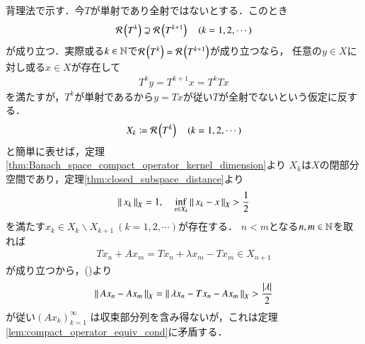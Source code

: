 	\begin{prf}
		背理法で示す．今$T$が単射であり全射ではないとする．このとき
		\begin{align}
			\mathcal{R}\left( T^k \right) \supsetneq \mathcal{R}\left( T^{k+1} \right) \quad (k = 1,2,\cdots)
		\end{align}
		が成り立つ．実際或る$k \in \mathbb{N}$で$\mathcal{R}\left( T^k \right) = \mathcal{R}\left( T^{k+1} \right)$が成り立つなら，
		任意の$y \in X$に対し或る$x \in X$が存在して
		\begin{align}
			T^{k} y = T^{k+1} x = T^k T x
		\end{align}
		を満たすが，$T^k$が単射であるから$y = T x$が従い$T$が全射でないという仮定に反する．
		\begin{align}
			X_k \coloneqq \mathcal{R}\left( T^k \right) \quad (k = 1,2,\cdots)
		\end{align}
		と簡単に表せば，定理\ref{thm:Banach_space_compact_operator_kernel_dimension}より
		$X_k$は$X$の閉部分空間であり，定理\ref{thm:closed_subspace_distance}より
		\begin{align}
			\left\|\, x_k\, \right\|_{X} = 1,
			\quad \operatorname*{inf}_{x \in X_k} \left\|\, x_k - x\, \right\|_{X} > \frac{1}{2}
			\label{eq:lem_T_injective_then_surjective}
		\end{align}
		を満たす$x_k \in X_k \backslash X_{k+1}\ (k=1,2,\cdots)$が存在する．
		$n < m$となる$n,m \in \mathbb{N}$を取れば
		\begin{align}
			T x_n + A x_m = T x_n + \lambda x_m - T x_m \in X_{n+1}
		\end{align}
		が成り立つから，()より
		\begin{align}
			\left\|\, A x_n - A x_m\, \right\|_{X} = \left\|\, \lambda x_n - T x_n - A x_m\, \right\|_{X} > \frac{|\lambda|}{2}
		\end{align}
		が従い$\left( A x_k \right)_{k=1}^{\infty}$
		は収束部分列を含み得ないが，これは定理\ref{lem:compact_operator_equiv_cond}に矛盾する．
		\QED
	\end{prf}